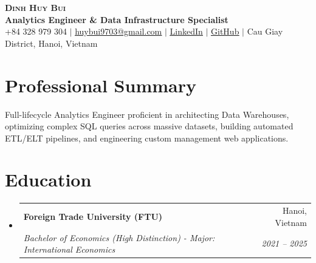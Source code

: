 \documentclass[letterpaper,11pt]{article}
\makeatletter
\newcommand{\resumeSubheading}[4]{
  \vspace{2pt}\item
    \begin{tabular*}{\textwidth}[t]{l@{\extracolsep{\fill}}r}
      \textbf{#1} & #2 \\
      \textit{\small#3} & \textit{\small #4} \\
    \end{tabular*}\vspace{-2pt}
}
\newcommand{\resumeSubHeadingListStart}{\begin{itemize}[leftmargin=0.15in, label={}]}
\newcommand{\resumeSubHeadingListEnd}{\end{itemize}}
\makeatother
\begin{document}
\begin{center}
    \textbf{\Huge \scshape Dinh Huy Bui} \\ \vspace{3pt}
    \small \textbf{\color{NavyBlue} Analytics Engineer \& Data Infrastructure Specialist} \\ \vspace{4pt}
    \small +84 328 979 304 $|$ \href{mailto:huybui9703@gmail.com}{\underline{huybui9703@gmail.com}} $|$ 
    \href{https://www.linkedin.com/in/dinh-huy-bui/}{\underline{LinkedIn}} $|$
    \href{https://github.com/dewey97}{\underline{GitHub}} $|$
    Cau Giay District, Hanoi, Vietnam
\end{center}

\vspace{2pt}

\section*{Professional Summary}
\small{Full-lifecycle Analytics Engineer proficient in architecting Data Warehouses, optimizing complex SQL queries across massive datasets, building automated ETL/ELT pipelines, and engineering custom management web applications.}

\section*{Education}
  \resumeSubHeadingListStart
    \resumeSubheading
      {Foreign Trade University (FTU)}{Hanoi, Vietnam}
      {Bachelor of Economics (High Distinction) - Major: International Economics}{2021 -- 2025}
  \resumeSubHeadingListEnd

\end{document}
